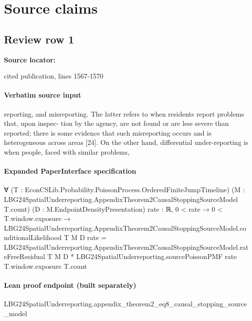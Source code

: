 \documentclass[10pt]{article}
\begin{document}
\clearpage
\hypertarget{source-claim-7382fb38891ed83e}{}
\hypertarget{source-section-f10b5f68e4acf3dc}{}
\section*{Source claims}
\subsection*{Review row 1}
\textbf{Source locator:} {\footnotesize\raggedright cited publication, lines 1567-\allowbreak{}1570\par}
\paragraph{Verbatim source input}
\begin{ReviewVerbatim}
reporting, and misreporting. The latter refers to when residents report problems that, upon inspec-
tion by the agency, are not found or are less severe than reported; there is some evidence that such
misreporting occurs and is heterogeneous across areas [24].
On the other hand, differential under-reporting is when people, faced with similar problems,
\end{ReviewVerbatim}


\paragraph{Expanded PaperInterface specification}
\begin{ReviewVerbatim}
∀ (T : EconCSLib.Probability.PoissonProcess.OrderedFiniteJumpTimeline)
  (M : LBG24SpatialUnderreporting.AppendixTheorem2CausalStoppingSourceModel T.count) (D : M.EndpointDensityPresentation)
  {rate : ℝ},
  0 < rate →
    0 < T.window.exposure →
      LBG24SpatialUnderreporting.AppendixTheorem2CausalStoppingSourceModel.conditionalLikelihood T M D rate =
        LBG24SpatialUnderreporting.AppendixTheorem2CausalStoppingSourceModel.rateFreeResidual T M D *
          LBG24SpatialUnderreporting.sourcePoissonPMF rate T.window.exposure T.count
\end{ReviewVerbatim}

\paragraph{Lean proof endpoint (built separately)}\begin{ReviewVerbatim}
LBG24SpatialUnderreporting.appendix_theorem2_eq8_causal_stopping_source_model
\end{ReviewVerbatim}
\end{document}
